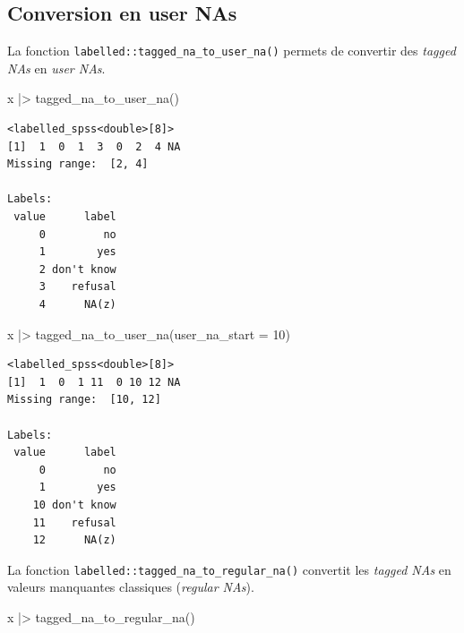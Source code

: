\documentclass[
  letterpaper,
  DIV=11,
  numbers=noendperiod,
  oneside]{scrreprt}
\newenvironment{Shaded}{\begin{snugshade}}{\end{snugshade}}
\newcommand{\AttributeTok}[1]{\textcolor[rgb]{0.40,0.45,0.13}{#1}}
\newcommand{\DecValTok}[1]{\textcolor[rgb]{0.68,0.00,0.00}{#1}}
\newcommand{\FunctionTok}[1]{\textcolor[rgb]{0.28,0.35,0.67}{#1}}
\newcommand{\NormalTok}[1]{\textcolor[rgb]{0.00,0.23,0.31}{#1}}
\newcommand{\SpecialCharTok}[1]{\textcolor[rgb]{0.37,0.37,0.37}{#1}}
\begin{document}
\hypertarget{conversion-en-user-nas}{%
\subsection{Conversion en user NAs}\label{conversion-en-user-nas}}

La fonction \texttt{labelled::tagged\_na\_to\_user\_na()} permets de
convertir des \emph{tagged NAs} en \emph{user NAs}.

\begin{Shaded}
\begin{Highlighting}[]
\NormalTok{x }\SpecialCharTok{|\textgreater{}} 
  \FunctionTok{tagged\_na\_to\_user\_na}\NormalTok{()}
\end{Highlighting}
\end{Shaded}

\begin{verbatim}
<labelled_spss<double>[8]>
[1]  1  0  1  3  0  2  4 NA
Missing range:  [2, 4]

Labels:
 value      label
     0         no
     1        yes
     2 don't know
     3    refusal
     4      NA(z)
\end{verbatim}

\begin{Shaded}
\begin{Highlighting}[]
\NormalTok{x }\SpecialCharTok{|\textgreater{}} 
  \FunctionTok{tagged\_na\_to\_user\_na}\NormalTok{(}\AttributeTok{user\_na\_start =} \DecValTok{10}\NormalTok{)}
\end{Highlighting}
\end{Shaded}

\begin{verbatim}
<labelled_spss<double>[8]>
[1]  1  0  1 11  0 10 12 NA
Missing range:  [10, 12]

Labels:
 value      label
     0         no
     1        yes
    10 don't know
    11    refusal
    12      NA(z)
\end{verbatim}

La fonction \texttt{labelled::tagged\_na\_to\_regular\_na()} convertit
les \emph{tagged NAs} en valeurs manquantes classiques (\emph{regular
NAs}).

\begin{Shaded}
\begin{Highlighting}[]
\NormalTok{x }\SpecialCharTok{|\textgreater{}} 
  \FunctionTok{tagged\_na\_to\_regular\_na}\NormalTok{()}
\end{Highlighting}
\end{Shaded}
\end{document}
